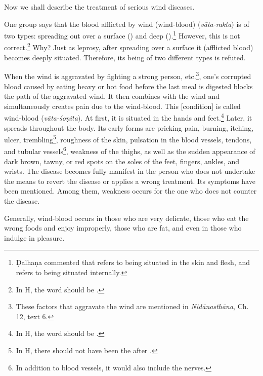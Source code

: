 \begin{translation}
    
    \item [1]
    Now we shall describe the treatment of serious wind diseases.
    
    \item [2]

    \item [3]
    One group says that the blood afflicted by wind (wind-blood) 
    (\textit{vāta-rakta}) is of two types: spreading out over a surface 
    () and deep ().\footnote{Ḍalhaṇa commented 
    \citep[424]{vulgate} that  refers to being situated in the skin and 
    flesh, and  refers to being situated internally.} However, this is 
    not correct.\footnote{In H, the word  should be .} Why? Just 
    as leprosy, after spreading over a surface it (afflicted blood) becomes deeply 
    situated. Therefore, its being of two different types is refuted.  

    \item[4]
    When the wind is aggravated by fighting a strong person, etc.\footnote{These factors that aggravate the wind are mentioned in \textit{Nidānasthāna}, Ch. 12, text 6.}, one's corrupted blood caused by eating heavy or hot food before the last meal is digested blocks the path of the aggravated wind. It then combines with the wind and simultaneously creates pain due to the wind-blood. This [condition] is called wind-blood (\textit{vāta-śoṇita}). At first, it is situated in the hands and feet.\footnote{In H, the word  should be .} Later, it spreads throughout the body. Its early forms are pricking pain, burning, itching, ulcer, trembling\footnote{In H, there should not have been the  after .}, roughness of the skin, pulsation in the blood vessels, tendons, and tubular vessels\footnote{In addition to blood vessels, it would also include the nerves.}, weakness of the thighs, as well as the sudden appearance of dark brown, tawny, or red spots on the soles of the feet, fingers, ankles, and wrists. The disease becomes fully manifest in the person who does not undertake the means to revert the disease or applies a wrong treatment. Its symptoms have been mentioned. Among them, weakness occurs for the one who does not counter the disease.

    \item[5]
    Generally, wind-blood occurs in those who are very delicate, those who eat the wrong foods and enjoy improperly, those who are fat, and even in those who indulge in pleasure.  


\end{translation}
